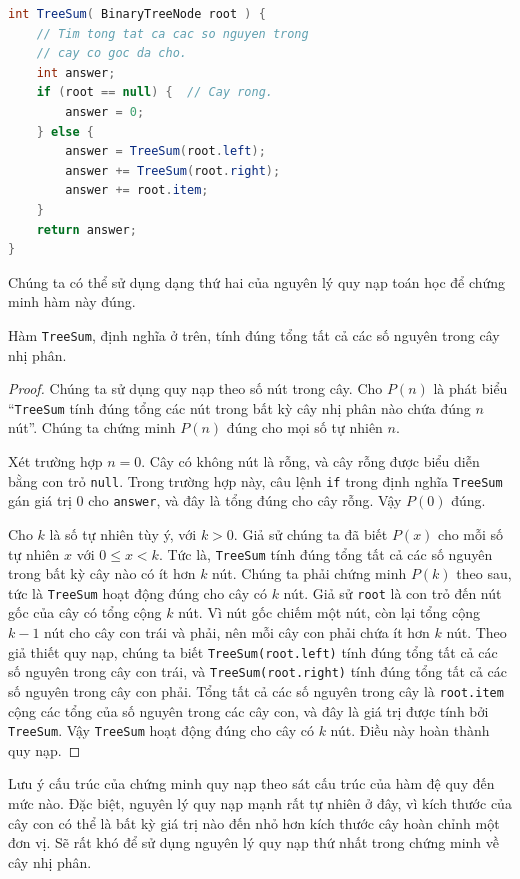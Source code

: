 \begin{lstlisting}[language=Java]
int TreeSum( BinaryTreeNode root ) {
    // Tim tong tat ca cac so nguyen trong
    // cay co goc da cho.
    int answer;
    if (root == null) {  // Cay rong.
        answer = 0;
    } else {
        answer = TreeSum(root.left);
        answer += TreeSum(root.right);
        answer += root.item;
    }
    return answer;
}
\end{lstlisting}

Chúng ta có thể sử dụng dạng thứ hai của nguyên lý quy nạp toán học để chứng minh hàm này đúng.

\begin{theorem}
Hàm \texttt{TreeSum}, định nghĩa ở trên, tính đúng tổng tất cả các số nguyên trong cây nhị phân.
\end{theorem}

\begin{proof}
Chúng ta sử dụng quy nạp theo số nút trong cây. Cho $P(n)$ là phát biểu ``\texttt{TreeSum} tính đúng tổng các nút trong bất kỳ cây nhị phân nào chứa đúng $n$ nút''. Chúng ta chứng minh $P(n)$ đúng cho mọi số tự nhiên $n$.

Xét trường hợp $n = 0$. Cây có không nút là rỗng, và cây rỗng được biểu diễn bằng con trỏ \texttt{null}. Trong trường hợp này, câu lệnh \texttt{if} trong định nghĩa \texttt{TreeSum} gán giá trị $0$ cho \texttt{answer}, và đây là tổng đúng cho cây rỗng. Vậy $P(0)$ đúng.

Cho $k$ là số tự nhiên tùy ý, với $k > 0$. Giả sử chúng ta đã biết $P(x)$ cho mỗi số tự nhiên $x$ với $0 \leq x < k$. Tức là, \texttt{TreeSum} tính đúng tổng tất cả các số nguyên trong bất kỳ cây nào có ít hơn $k$ nút. Chúng ta phải chứng minh $P(k)$ theo sau, tức là \texttt{TreeSum} hoạt động đúng cho cây có $k$ nút. Giả sử \texttt{root} là con trỏ đến nút gốc của cây có tổng cộng $k$ nút. Vì nút gốc chiếm một nút, còn lại tổng cộng $k - 1$ nút cho cây con trái và phải, nên mỗi cây con phải chứa ít hơn $k$ nút. Theo giả thiết quy nạp, chúng ta biết \texttt{TreeSum(root.left)} tính đúng tổng tất cả các số nguyên trong cây con trái, và \texttt{TreeSum(root.right)} tính đúng tổng tất cả các số nguyên trong cây con phải. Tổng tất cả các số nguyên trong cây là \texttt{root.item} cộng các tổng của số nguyên trong các cây con, và đây là giá trị được tính bởi \texttt{TreeSum}. Vậy \texttt{TreeSum} hoạt động đúng cho cây có $k$ nút. Điều này hoàn thành quy nạp.
\end{proof}

Lưu ý cấu trúc của chứng minh quy nạp theo sát cấu trúc của hàm đệ quy đến mức nào. Đặc biệt, nguyên lý quy nạp mạnh rất tự nhiên ở đây, vì kích thước của cây con có thể là bất kỳ giá trị nào đến nhỏ hơn kích thước cây hoàn chỉnh một đơn vị. Sẽ rất khó để sử dụng nguyên lý quy nạp thứ nhất trong chứng minh về cây nhị phân.

